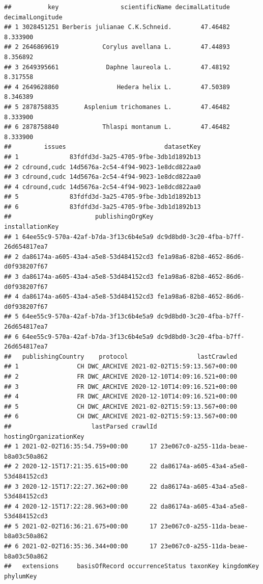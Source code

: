 \documentclass[
]{book}
\begin{document}
\begin{verbatim}
##          key                 scientificName decimalLatitude decimalLongitude
## 1 3028451251 Berberis julianae C.K.Schneid.        47.46482         8.333900
## 2 2646869619            Corylus avellana L.        47.44893         8.356892
## 3 2649395661             Daphne laureola L.        47.48192         8.317558
## 4 2649628860                Hedera helix L.        47.50389         8.346389
## 5 2878758835       Asplenium trichomanes L.        47.46482         8.333900
## 6 2878758840            Thlaspi montanum L.        47.46482         8.333900
##         issues                           datasetKey
## 1              83fdfd3d-3a25-4705-9fbe-3db1d1892b13
## 2 cdround,cudc 14d5676a-2c54-4f94-9023-1e8dcd822aa0
## 3 cdround,cudc 14d5676a-2c54-4f94-9023-1e8dcd822aa0
## 4 cdround,cudc 14d5676a-2c54-4f94-9023-1e8dcd822aa0
## 5              83fdfd3d-3a25-4705-9fbe-3db1d1892b13
## 6              83fdfd3d-3a25-4705-9fbe-3db1d1892b13
##                       publishingOrgKey                      installationKey
## 1 64ee55c9-570a-42af-b7da-3f13c6b4e5a9 dc9d8bd0-3c20-4fba-b7ff-26d654817ea7
## 2 da86174a-a605-43a4-a5e8-53d484152cd3 fe1a98a6-82b8-4652-86d6-d0f938207f67
## 3 da86174a-a605-43a4-a5e8-53d484152cd3 fe1a98a6-82b8-4652-86d6-d0f938207f67
## 4 da86174a-a605-43a4-a5e8-53d484152cd3 fe1a98a6-82b8-4652-86d6-d0f938207f67
## 5 64ee55c9-570a-42af-b7da-3f13c6b4e5a9 dc9d8bd0-3c20-4fba-b7ff-26d654817ea7
## 6 64ee55c9-570a-42af-b7da-3f13c6b4e5a9 dc9d8bd0-3c20-4fba-b7ff-26d654817ea7
##   publishingCountry    protocol                   lastCrawled
## 1                CH DWC_ARCHIVE 2021-02-02T15:59:13.567+00:00
## 2                FR DWC_ARCHIVE 2020-12-10T14:09:16.521+00:00
## 3                FR DWC_ARCHIVE 2020-12-10T14:09:16.521+00:00
## 4                FR DWC_ARCHIVE 2020-12-10T14:09:16.521+00:00
## 5                CH DWC_ARCHIVE 2021-02-02T15:59:13.567+00:00
## 6                CH DWC_ARCHIVE 2021-02-02T15:59:13.567+00:00
##                      lastParsed crawlId               hostingOrganizationKey
## 1 2021-02-02T16:35:54.759+00:00      17 23e067c0-a255-11da-beae-b8a03c50a862
## 2 2020-12-15T17:21:35.615+00:00      22 da86174a-a605-43a4-a5e8-53d484152cd3
## 3 2020-12-15T17:22:27.362+00:00      22 da86174a-a605-43a4-a5e8-53d484152cd3
## 4 2020-12-15T17:22:28.963+00:00      22 da86174a-a605-43a4-a5e8-53d484152cd3
## 5 2021-02-02T16:36:21.675+00:00      17 23e067c0-a255-11da-beae-b8a03c50a862
## 6 2021-02-02T16:35:36.344+00:00      17 23e067c0-a255-11da-beae-b8a03c50a862
##   extensions     basisOfRecord occurrenceStatus taxonKey kingdomKey phylumKey

\end{verbatim}
\end{document}
